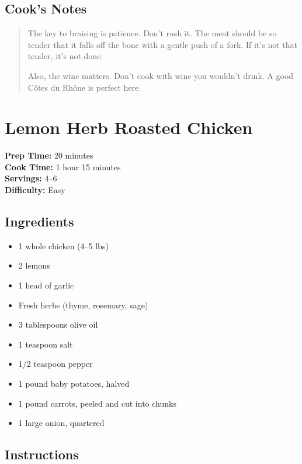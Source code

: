\documentclass[
    language=english,
    doctype=recipe-book,
    institution=none,
]{../../omnilatex}
\begin{document}
\subsection*{Cook's Notes}
\begin{quote}
The key to braising is patience. Don't rush it. The meat should be so tender that it falls off the bone with a gentle push of a fork. If it's not that tender, it's not done.

Also, the wine matters. Don't cook with wine you wouldn't drink. A good Côtes du Rhône is perfect here.
\end{quote}

\section*{Lemon Herb Roasted Chicken}

\begin{recipebox}
\textbf{Prep Time:} 20 minutes\\
\textbf{Cook Time:} 1 hour 15 minutes\\
\textbf{Servings:} 4--6\\
\textbf{Difficulty:} Easy
\end{recipebox}

\subsection*{Ingredients}

\begin{itemize}
    \item 1 whole chicken (4--5 lbs)
    \item 2 lemons
    \item 1 head of garlic
    \item Fresh herbs (thyme, rosemary, sage)
    \item 3 tablespoons olive oil
    \item 1 teaspoon salt
    \item 1/2 teaspoon pepper
    \item 1 pound baby potatoes, halved
    \item 1 pound carrots, peeled and cut into chunks
    \item 1 large onion, quartered
\end{itemize}

\subsection*{Instructions}
\end{document}

